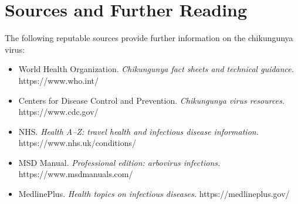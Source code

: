 \section*{Sources and Further Reading}
The following reputable sources provide further information on the chikungunya virus:
\begin{itemize}
    \item World Health Organization. \textit{Chikungunya fact sheets and technical guidance.} https://www.who.int/
    \item Centers for Disease Control and Prevention. \textit{Chikungunya virus resources.} https://www.cdc.gov/
    \item NHS. \textit{Health A--Z: travel health and infectious disease information.} https://www.nhs.uk/conditions/
    \item MSD Manual. \textit{Professional edition: arbovirus infections.} https://www.msdmanuals.com/
    \item MedlinePlus. \textit{Health topics on infectious diseases.} https://medlineplus.gov/
\end{itemize}
